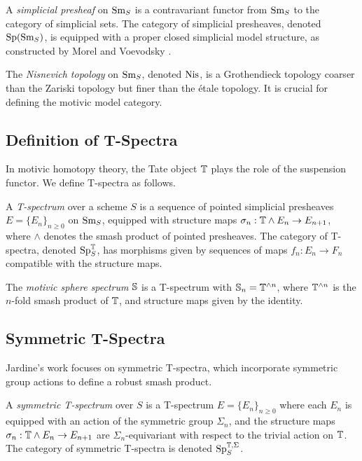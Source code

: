 \documentclass{article}
\begin{document}
\begin{definition}
A \emph{simplicial presheaf} on \( \text{Sm}_S \) is a contravariant functor from \( \text{Sm}_S \) to the category of simplicial sets. The category of simplicial presheaves, denoted \( \text{Sp}(\text{Sm}_S) \), is equipped with a proper closed simplicial model structure, as constructed by Morel and Voevodsky \cite{MorelVoevodsky1999}.
\end{definition}

\begin{remark}
The \emph{Nisnevich topology} on \( \text{Sm}_S \), denoted \( \text{Nis} \), is a Grothendieck topology coarser than the Zariski topology but finer than the étale topology. It is crucial for defining the motivic model category.
\end{remark}

\subsection{Definition of T-Spectra}

In motivic homotopy theory, the Tate object \( \mathbb{T} \) plays the role of the suspension functor. We define T-spectra as follows.

\begin{definition}
A \emph{T-spectrum} over a scheme \( S \) is a sequence of pointed simplicial presheaves \( E = \{ E_n \}_{n \geq 0} \) on \( \text{Sm}_S \), equipped with structure maps \( \sigma_n: \mathbb{T} \wedge E_n \to E_{n+1} \), where \( \wedge \) denotes the smash product of pointed presheaves. The category of T-spectra, denoted \( \text{Sp}^{\mathbb{T}}_S \), has morphisms given by sequences of maps \( f_n: E_n \to F_n \) compatible with the structure maps.
\end{definition}

\begin{example}
The \emph{motivic sphere spectrum} \( \mathbb{S} \) is a T-spectrum with \( \mathbb{S}_n = \mathbb{T}^{\wedge n} \), where \( \mathbb{T}^{\wedge n} \) is the \( n \)-fold smash product of \( \mathbb{T} \), and structure maps given by the identity.
\end{example}

\subsection{Symmetric T-Spectra}

Jardine’s work focuses on symmetric T-spectra, which incorporate symmetric group actions to define a robust smash product.

\begin{definition}
A \emph{symmetric T-spectrum} over \( S \) is a T-spectrum \( E = \{ E_n \}_{n \geq 0} \) where each \( E_n \) is equipped with an action of the symmetric group \( \Sigma_n \), and the structure maps \( \sigma_n: \mathbb{T} \wedge E_n \to E_{n+1} \) are \( \Sigma_n \)-equivariant with respect to the trivial action on \( \mathbb{T} \). The category of symmetric T-spectra is denoted \( \text{Sp}^{\mathbb{T}, \Sigma}_S \).
\end{definition}
\end{document}
